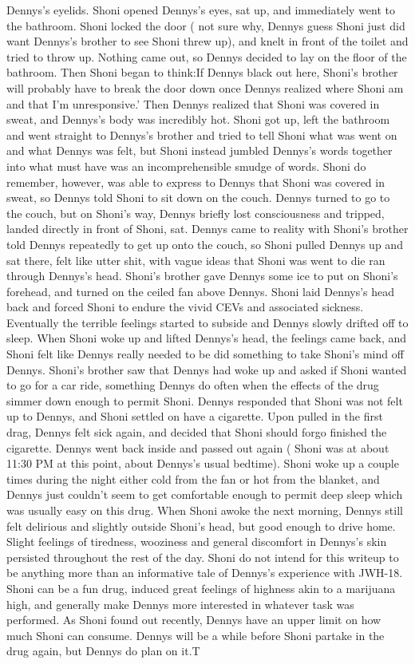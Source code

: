 \documentclass[12pt]{book}
\begin{document}
Dennys's eyelids. Shoni opened Dennys's eyes, sat up, and immediately went to the bathroom. Shoni locked the door ( not sure why, Dennys guess Shoni just did want Dennys's brother to see Shoni threw up), and knelt in front of the toilet and tried to throw up. Nothing came out, so Dennys decided to lay on the floor of the bathroom. Then Shoni began to think:If Dennys black out here, Shoni's brother will probably have to break the door down once Dennys realized where Shoni am and that I'm unresponsive.' Then Dennys realized that Shoni was covered in sweat, and Dennys's body was incredibly hot. Shoni got up, left the bathroom and went straight to Dennys's brother and tried to tell Shoni what was went on and what Dennys was felt, but Shoni instead jumbled Dennys's words together into what must have was an incomprehensible smudge of words. Shoni do remember, however, was able to express to Dennys that Shoni was covered in sweat, so Dennys told Shoni to sit down on the couch. Dennys turned to go to the couch, but on Shoni's way, Dennys briefly lost consciousness and tripped, landed directly in front of Shoni, sat. Dennys came to reality with Shoni's brother told Dennys repeatedly to get up onto the couch, so Shoni pulled Dennys up and sat there, felt like utter shit, with vague ideas that Shoni was went to die ran through Dennys's head. Shoni's brother gave Dennys some ice to put on Shoni's forehead, and turned on the ceiled fan above Dennys. Shoni laid Dennys's head back and forced Shoni to endure the vivid CEVs and associated sickness. Eventually the terrible feelings started to subside and Dennys slowly drifted off to sleep. When Shoni woke up and lifted Dennys's head, the feelings came back, and Shoni felt like Dennys really needed to be did something to take Shoni's mind off Dennys. Shoni's brother saw that Dennys had woke up and asked if Shoni wanted to go for a car ride, something Dennys do often when the effects of the drug simmer down enough to permit Shoni. Dennys responded that Shoni was not felt up to Dennys, and Shoni settled on have a cigarette. Upon pulled in the first drag, Dennys felt sick again, and decided that Shoni should forgo finished the cigarette. Dennys went back inside and passed out again ( Shoni was at about 11:30 PM at this point, about Dennys's usual bedtime). Shoni woke up a couple times during the night either cold from the fan or hot from the blanket, and Dennys just couldn't seem to get comfortable enough to permit deep sleep which was usually easy on this drug. When Shoni awoke the next morning, Dennys still felt delirious and slightly outside Shoni's head, but good enough to drive home. Slight feelings of tiredness, wooziness and general discomfort in Dennys's skin persisted throughout the rest of the day. Shoni do not intend for this writeup to be anything more than an informative tale of Dennys's experience with JWH-18. Shoni can be a fun drug, induced great feelings of highness akin to a marijuana high, and generally make Dennys more interested in whatever task was performed. As Shoni found out recently, Dennys have an upper limit on how much Shoni can consume. Dennys will be a while before Shoni partake in the drug again, but Dennys do plan on it.T
\end{document}
